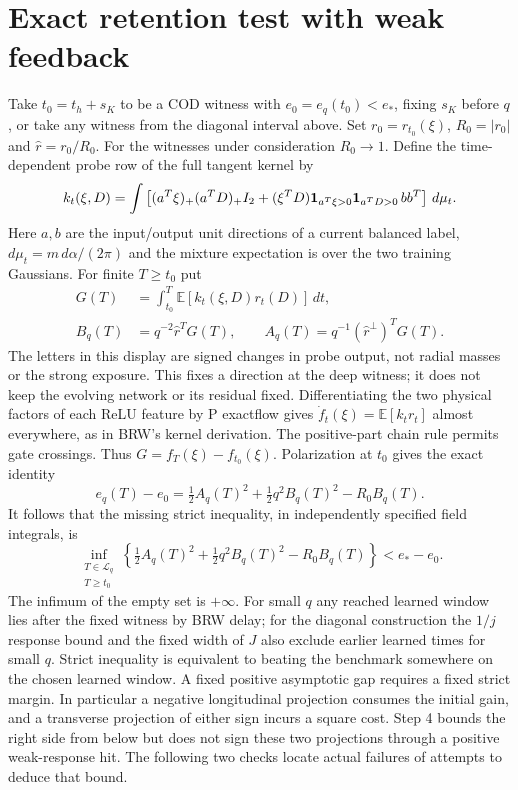 \documentclass[11pt]{article}
\begin{document}
\section{Exact retention test with weak feedback}
Take $t_0=t_h+s_K$ to be a COD witness with $e_0=e_q(t_0)<e_*$,
fixing $s_K$ before $q$, or take any witness from the diagonal
interval above. Set $r_0=r_{t_0}(\xi)$, $R_0=|r_0|$ and
$\hat r=r_0/R_0$. For the witnesses under consideration $R_0\to1$.
Define the time-dependent probe row of the full tangent kernel by
\[
 k_t(\xi,D)=\int\left[
 (a^T\xi)_+(a^TD)_+ I_2+
 (\xi^TD){\bf1}_{a^T\xi>0}{\bf1}_{a^TD>0}\,bb^T
 \right]\,d\mu_t .
\]
Here $a,b$ are the input/output unit directions of a current
balanced label, $d\mu_t=m\,d\alpha/(2\pi)$ and the mixture expectation
is over the two training Gaussians. For finite $T\ge t_0$ put
\begin{align}
 G(T)&=\int_{t_0}^{T}\mathbb E[k_t(\xi,D)r_t(D)]\,dt,\nonumber\\
 B_q(T)&=q^{-2}\hat r^T G(T),\qquad
 A_q(T)=q^{-1}(\hat r^\perp)^T G(T). \label{an04drrv1:projections}
\end{align}
The letters in this display are signed changes in probe output, not
radial masses or the strong exposure. This fixes a direction at the
deep witness; it does not keep the evolving network or its residual
fixed. Differentiating the two physical factors of each ReLU
feature by P exactflow gives $\dot f_t(\xi)=\mathbb E[k_t r_t]$
almost everywhere, as in BRW's kernel derivation. The positive-part
chain rule permits gate crossings. Thus $G=f_T(\xi)-f_{t_0}(\xi)$.
Polarization at $t_0$ gives the exact identity
\begin{equation}\label{an04drrv1:test}
 e_q(T)-e_0=\tfrac12 A_q(T)^2+\tfrac12q^2 B_q(T)^2-R_0 B_q(T).
\end{equation}
It follows that the missing strict inequality, in independently
specified field integrals, is
\begin{equation}\label{an04drrv1:missing}
 \inf_{\substack{T\in\mathcal L_q\\T\ge t_0}}
 \left\{\tfrac12 A_q(T)^2+\tfrac12q^2 B_q(T)^2-R_0 B_q(T)\right\}
       < e_*-e_0 .
\end{equation}
The infimum of the empty set is $+\infty$. For small $q$ any reached
learned window lies after the fixed witness by BRW delay; for the
diagonal construction the $1/j$ response bound and the fixed width
of $J$ also exclude earlier learned times for small $q$.
Strict inequality is equivalent to beating the benchmark somewhere
on the chosen learned window. A fixed positive asymptotic gap
requires a fixed strict margin. In particular a negative longitudinal
projection consumes the initial gain, and a transverse projection
of either sign incurs a square cost. Step 4 bounds the right side
from below but does not sign these two projections through a positive
weak-response hit. The following two checks locate actual failures
of attempts to deduce that bound.
\end{document}

